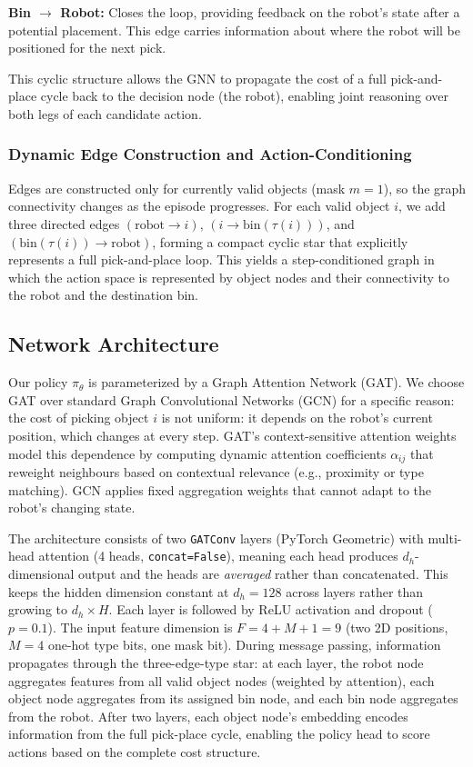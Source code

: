 \documentclass[conference]{IEEEtran}
\begin{document}
\textbf{Bin $\to$ Robot:} Closes the loop, providing feedback on the robot's state after a potential placement. This edge carries information about where the robot will be positioned for the next pick.

This cyclic structure allows the GNN to propagate the cost of a full pick-and-place cycle back to the decision node (the robot), enabling joint reasoning over both legs of each candidate action.

\subsubsection{Dynamic Edge Construction and Action-Conditioning}
Edges are constructed only for currently valid objects (mask $m=1$), so the graph connectivity changes as the episode progresses.
For each valid object $i$, we add three directed edges $(\text{robot}\rightarrow i)$, $(i \rightarrow \text{bin}(\tau(i)))$, and $(\text{bin}(\tau(i)) \rightarrow \text{robot})$, forming a compact cyclic star that explicitly represents a full pick-and-place loop.
This yields a step-conditioned graph in which the action space is represented by object nodes and their connectivity to the robot and the destination bin.

\subsection{Network Architecture}
Our policy $\pi_\theta$ is parameterized by a Graph Attention Network (GAT). We choose GAT over standard Graph Convolutional Networks (GCN) for a specific reason: the cost of picking object $i$ is not uniform: it depends on the robot's current position, which changes at every step. GAT's context-sensitive attention weights model this dependence by computing dynamic attention coefficients $\alpha_{ij}$ that reweight neighbours based on contextual relevance (e.g., proximity or type matching). GCN applies fixed aggregation weights that cannot adapt to the robot's changing state.

The architecture consists of two \texttt{GATConv} layers (PyTorch Geometric) with multi-head attention (4 heads, \texttt{concat=False}), meaning each head produces $d_h$-dimensional output and the heads are \emph{averaged} rather than concatenated. This keeps the hidden dimension constant at $d_h{=}128$ across layers rather than growing to $d_h \times H$. Each layer is followed by ReLU activation and dropout ($p=0.1$). The input feature dimension is $F{=}4 + M + 1 = 9$ (two 2D positions, $M{=}4$ one-hot type bits, one mask bit). During message passing, information propagates through the three-edge-type star: at each layer, the robot node aggregates features from all valid object nodes (weighted by attention), each object node aggregates from its assigned bin node, and each bin node aggregates from the robot. After two layers, each object node's embedding encodes information from the full pick-place cycle, enabling the policy head to score actions based on the complete cost structure.
\end{document}
